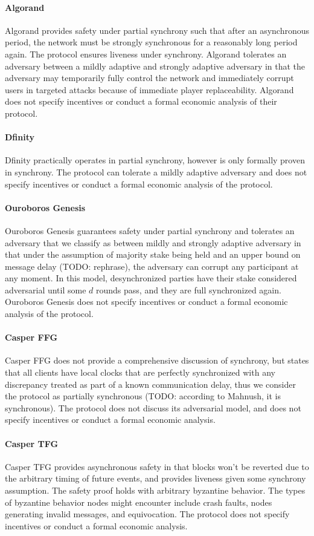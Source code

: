 \documentclass[10pt,journal,compsoc]{IEEEtran}
\begin{document}
\paragraph{Algorand} Algorand provides safety under partial synchrony such that after an asynchronous period, the network must be strongly synchronous for a reasonably long period again. The protocol ensures liveness under synchrony. Algorand tolerates an adversary between a mildly adaptive and strongly adaptive adversary in that the adversary may temporarily fully control the network and immediately corrupt users in targeted attacks because of immediate player replaceability. Algorand does not specify incentives or conduct a formal economic analysis of their protocol. 
\paragraph{Dfinity} Dfinity practically operates in partial synchrony, however is only formally proven in synchrony. The protocol can tolerate a mildly adaptive adversary and does not specify incentives or conduct a formal economic analysis of the protocol.
\paragraph{Ouroboros Genesis} Ouroboros Genesis guarantees safety under partial synchrony and tolerates an adversary that we classify as between mildly and strongly adaptive adversary in that under the assumption of majority stake being held and an upper bound on message delay (TODO: rephrase), the adversary can corrupt any participant at any moment. In this model, desynchronized parties have their stake considered adversarial until some $d$ rounds pass, and they are full synchronized again. Ouroboros Genesis does not specify incentives or conduct a formal economic analysis of the protocol. 
\paragraph{Casper FFG} Casper FFG does not provide a comprehensive discussion of synchrony, but states that all clients have local clocks that are perfectly synchronized with any discrepancy treated as part of a known communication delay, thus we consider the protocol as partially synchronous (TODO: according to Mahnush, it is synchronous). The protocol does not discuss its adversarial model, and does not specify incentives or conduct a formal economic analysis. 
\paragraph{Casper TFG} Casper TFG provides asynchronous safety in that blocks won't be reverted due to the arbitrary timing of future events, and provides liveness given some synchrony assumption. The safety proof holds with arbitrary byzantine behavior. The types of byzantine behavior nodes might encounter include crash faults, nodes generating invalid messages, and equivocation. The protocol does not specify incentives or conduct a formal economic analysis. 
\end{document}

